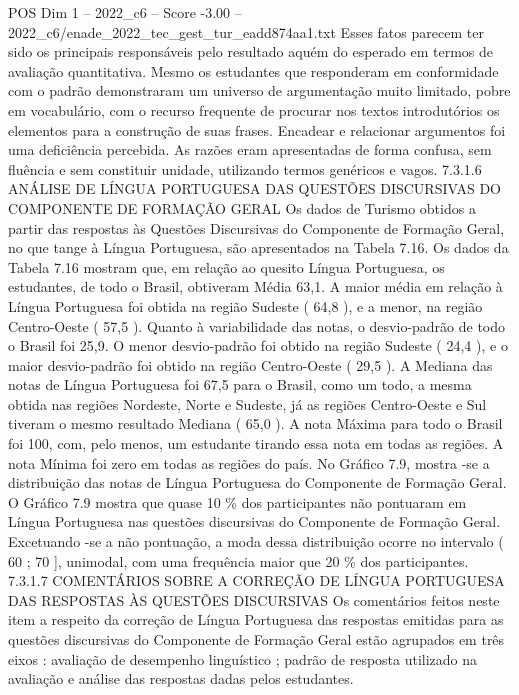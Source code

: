 \begin{textsample}{POS Dim 1 – 2022\_c6 – Score -3.00 – 2022\_c6/enade\_2022\_tec\_gest\_tur\_eadd874aa1.txt}
Esses fatos parecem ter sido os principais responsáveis pelo resultado aquém do esperado em termos de avaliação quantitativa.
Mesmo os estudantes que responderam em conformidade com o padrão demonstraram um universo de argumentação muito limitado, pobre em vocabulário, com o recurso frequente de procurar nos textos introdutórios os elementos para a construção de suas frases.
Encadear e relacionar argumentos foi uma deficiência percebida.
As razões eram apresentadas de forma confusa, sem fluência e sem constituir unidade, utilizando termos genéricos e vagos. 7.3.1.6 ANÁLISE DE LÍNGUA PORTUGUESA DAS QUESTÕES DISCURSIVAS DO COMPONENTE DE FORMAÇÃO GERAL Os dados de Turismo obtidos a partir das respostas às Questões Discursivas do Componente de Formação Geral, no que tange à Língua Portuguesa, são apresentados na Tabela 7.16.
Os dados da Tabela 7.16 mostram que, em relação ao quesito Língua Portuguesa, os estudantes, de todo o Brasil, obtiveram Média 63,1.
A maior média em relação à Língua Portuguesa foi obtida na região Sudeste ( 64,8 ), e a menor, na região Centro-Oeste ( 57,5 ).
Quanto à variabilidade das notas, o desvio-padrão de todo o Brasil foi 25,9.
O menor desvio-padrão foi obtido na região Sudeste ( 24,4 ), e o maior desvio-padrão foi obtido na região Centro-Oeste ( 29,5 ).
A Mediana das notas de Língua Portuguesa foi 67,5 para o Brasil, como um todo, a mesma obtida nas regiões Nordeste, Norte e Sudeste, já as regiões Centro-Oeste e Sul tiveram o mesmo resultado Mediana ( 65,0 ).
A nota Máxima para todo o Brasil foi 100, com, pelo menos, um estudante tirando essa nota em todas as regiões.
A nota Mínima foi zero em todas as regiões do país.
No Gráfico 7.9, mostra -se a distribuição das notas de Língua Portuguesa do Componente de Formação Geral.
O Gráfico 7.9 mostra que quase 10 \% dos participantes não pontuaram em Língua Portuguesa nas questões discursivas do Componente de Formação Geral.
Excetuando -se a não pontuação, a moda dessa distribuição ocorre no intervalo ( 60 ; 70 ], unimodal, com uma frequência maior que 20 \% dos participantes. 7.3.1.7 COMENTÁRIOS SOBRE A CORREÇÃO DE LÍNGUA PORTUGUESA DAS RESPOSTAS ÀS QUESTÕES DISCURSIVAS Os comentários feitos neste item a respeito da correção de Língua Portuguesa das respostas emitidas para as questões discursivas do Componente de Formação Geral estão agrupados em três eixos : avaliação de desempenho linguístico ; padrão de resposta utilizado na avaliação e análise das respostas dadas pelos estudantes.

\end{textsample}
